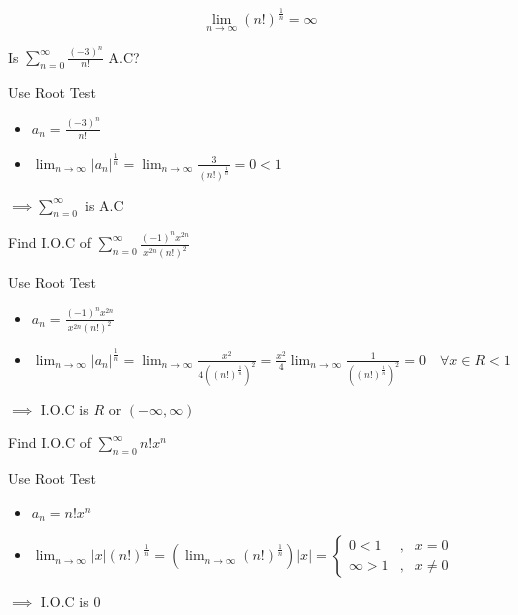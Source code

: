 \begin{lemma}
\[\displaystyle \lim_{n \to \infty} (n!)^{\frac{1}{n}} = \infty\]
\end{lemma}
\begin{eg}
Is \(\displaystyle \sum^{\infty}_{n = 0} \frac{(-3)^n}{n!}\) A.C?

\soln
Use Root Test
\begin{itemize}
\item \(\displaystyle a_n = \frac{(-3)^n}{n!}\)
\item \(\displaystyle \lim_{n \to \infty} |a_n|^{\frac{1}{n}} = \lim_{n \to \infty} \frac{3}{(n!)^{\frac{1}{n}}} = 0 < 1\)
\end{itemize}
\(\displaystyle \implies \sum^{\infty}_{n = 0}\) is A.C
\end{eg}
\begin{eg}
Find I.O.C of \(\displaystyle \sum^{\infty}_{n = 0} \frac{(-1)^n x^{2n}}{x^{2n}(n!)^2}\)

\soln
Use Root Test
\begin{itemize}
\item \(\displaystyle a_n = \frac{(-1)^n x^{2n}}{x^{2n}(n!)^2}\)
\item \(\displaystyle \lim_{n \to \infty} |a_n|^{\frac{1}{n}} = \lim_{n \to \infty} \frac{x^2}{4((n!)^{\frac{1}{n}})^2} = \frac{x^2}{4} \lim_{n \to \infty} \frac{1}{((n!)^{\frac{1}{n}})^2} = 0 \quad \forall x \in R < 1\)
\end{itemize}
\(\implies\) I.O.C is \(R\) or \((-\infty, \infty)\)
\end{eg}
\begin{eg}
Find I.O.C of \(\displaystyle \sum^{\infty}_{n = 0} n!x^n\)

\soln
Use Root Test
\begin{itemize}
\item \(\displaystyle a_n = n!x^n\)
\item \(\displaystyle \lim_{n \to \infty} |x|(n!)^{\frac{1}{n}} = (\lim_{n \to \infty} (n!)^{\frac{1}{n}}) |x| = \left\{ \begin{array}{rcl}
0 < 1 &, & x = 0\\
\infty > 1 &, & x \neq 0
\end{array} \right.\)
\end{itemize}
\(\implies\) I.O.C is \({0}\)
\end{eg}
